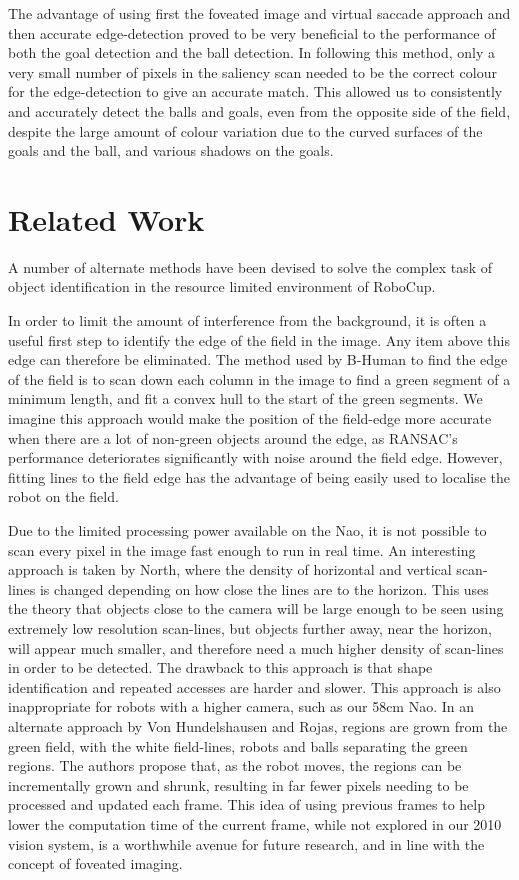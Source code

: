 \documentclass[runningheads,a4paper]{llncs}
\begin{document}
The advantage of using first the foveated image and virtual saccade approach
and then accurate edge-detection proved to be very beneficial to the performance
of both the goal detection and the ball detection. In following this method,
only a very small number of pixels in the saliency scan needed to be the correct
colour for the edge-detection to give an accurate match. This allowed us to
consistently and accurately detect the balls and goals, even from the opposite
side of the field, despite the large amount of colour variation due to the
curved surfaces of the goals and the ball, and various shadows on the goals.  


\section{Related Work}

A number of alternate methods have been devised to solve the complex task of object identification in the resource limited environment of RoboCup.

In order to limit the amount of interference from the background, it is often a
useful first step to identify the edge of the field in the image. Any item above
this edge can therefore be eliminated. The method used by B-Human
\cite{thomas09code} to find the edge of the field is to scan down each column in
the image to find a green segment of a minimum length, and fit a convex hull to
the start of the green segments. We imagine this approach would make the
position of the field-edge more accurate when there are a lot of non-green
objects around the edge, as RANSAC's performance deteriorates significantly with noise around the field edge. However, fitting lines to the field edge has the advantage of being easily used to localise the robot on the field.

Due to the limited processing power available on the Nao, it is not possible to
scan every pixel in the image fast enough to run in real time. An interesting
approach is taken by North\cite{north2005object}, where the density of
horizontal and vertical scan-lines is changed depending on how close the
lines are to the horizon. This uses the theory that objects close to the camera
will be large enough to be seen using extremely low resolution scan-lines, but
objects further away, near the horizon, will appear much smaller, and therefore
need a much higher density of scan-lines in order to be detected. The drawback
to this approach is that shape identification and repeated accesses are harder
and slower. This approach is also inappropriate for robots with a higher
camera, such as our 58cm Nao. In an alternate approach by Von Hundelshausen and
Rojas\cite{von2004tracking}, regions are grown from the green field, with the
white field-lines, robots and balls separating the green regions. The authors
propose that, as the robot moves, the regions can be incrementally grown and
shrunk, resulting in far fewer pixels needing to be processed and updated each
frame. This idea of using previous frames to help lower the computation time of
the current frame, while not explored in our 2010 vision system, is a worthwhile
avenue for future research, and in line with the concept of foveated imaging.
\end{document}
